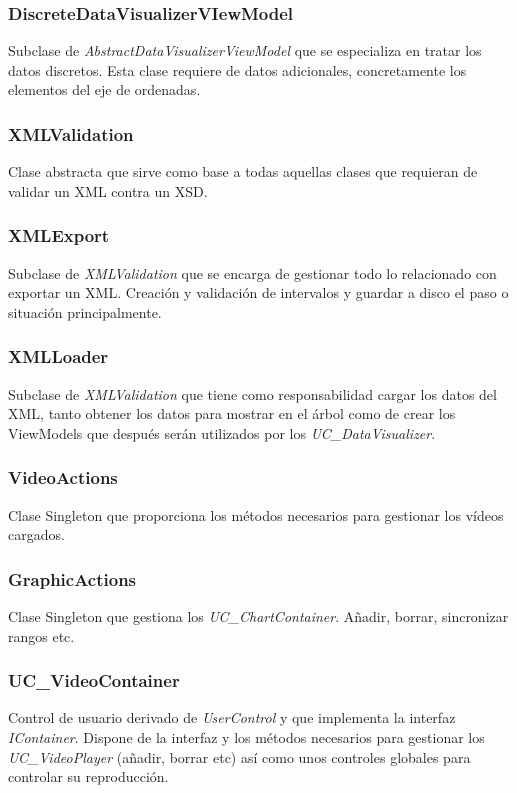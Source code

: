 \subsubsection{DiscreteDataVisualizerVIewModel}
Subclase de \emph{AbstractDataVisualizerViewModel} que se especializa en tratar los datos discretos.
Esta clase requiere de datos adicionales, concretamente los elementos del eje de ordenadas.

\subsubsection{XMLValidation}
Clase abstracta que sirve como base a todas aquellas clases que requieran de validar un XML contra un XSD.

\subsubsection{XMLExport}
Subclase de \emph{XMLValidation} que se encarga de gestionar todo lo relacionado con exportar un XML. Creaci\'on y
validaci\'on de intervalos y guardar a disco el paso o situaci\'on principalmente.

\subsubsection{XMLLoader}
Subclase de \emph{XMLValidation} que tiene como responsabilidad cargar los datos del XML, tanto obtener los datos
para mostrar en el \'arbol como de crear los ViewModels que despu\'es ser\'an utilizados por los \emph{UC\_DataVisualizer}.

\subsubsection{VideoActions}
Clase Singleton que proporciona los m\'etodos necesarios para gestionar los v\'ideos cargados.

\subsubsection{GraphicActions}
Clase Singleton que gestiona los \emph{UC\_ChartContainer}. A\~nadir, borrar, sincronizar rangos etc.

\subsubsection{UC\_VideoContainer}
Control de usuario derivado de \emph{UserControl} y que implementa
la interfaz \emph{IContainer}. Dispone de la interfaz y los m\'etodos necesarios para
gestionar los \emph{UC\_VideoPlayer} (a\~nadir, borrar etc) as\'i como unos controles globales
para controlar su reproducci\'on.

